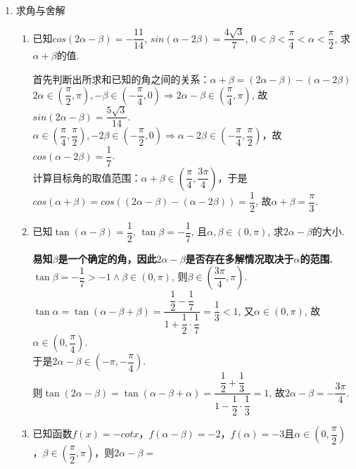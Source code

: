 \begin{enumerate}
\begin{enumerate}
\begin{jieda}
        \end{jieda}
    \end{enumerate}
    \item 求角与舍解
    \begin{enumerate}
        \item 已知$cos(2\alpha-\beta)=-\dfrac{11}{14}$, $sin(\alpha-2\beta)=\dfrac{4\sqrt{3}}{7}$, 
        $0<\beta<\dfrac{\pi}{4}<\alpha<\dfrac{\pi}{2}$, 求$\alpha+\beta$的值. 
        \begin{jieda}
        首先判断出所求和已知的角之间的关系：$\alpha+\beta = (2\alpha-\beta)-(\alpha-2\beta)$ \\
        $2\alpha \in \left(\dfrac{\pi}{2}, \pi \right), -\beta \in \left(-\dfrac{\pi}{4}, 0 \right) \Longrightarrow 2\alpha-\beta \in \left(\dfrac{\pi}{4}, \pi \right)$, 故$sin(2\alpha-\beta)=\dfrac{5\sqrt{3}}{14}$. \\
        $\alpha \in \left(\dfrac{\pi}{4}, \dfrac{\pi}{2} \right), -2\beta \in \left(-\dfrac{\pi}{2}, 0 \right) \Longrightarrow \alpha-2\beta \in \left(-\dfrac{\pi}{4}, \dfrac{\pi}{2} \right)$，故$cos(\alpha-2\beta)=\dfrac{1}{7}$. \\
        计算目标角的取值范围：$\alpha+\beta\in\left(\dfrac{\pi}{4},\dfrac{3\pi}{4}\right)$，于是$cos(\alpha+\beta)=cos((2\alpha-\beta)-(\alpha-2\beta))=\dfrac{1}{2}$, 故$\alpha+\beta=\dfrac{\pi}{3}$. 
        \end{jieda}
        \item 已知$\tan(\alpha-\beta)=\dfrac{1}{2}$, $\tan\beta=-\dfrac{1}{7}$, 且$\alpha,\beta\in(0,\pi)$, 求$2\alpha-\beta$的大小. 
        \begin{jieda}
        \textbf{易知$\beta$是一个确定的角，因此$2\alpha-\beta$是否存在多解情况取决于$\alpha$的范围.} \\
        $\tan\beta=-\dfrac{1}{7}>-1\land\beta\in(0,\pi)$, 则$\beta\in\left(\dfrac{3\pi}{4},\pi\right)$. \\
        $\tan\alpha=\tan(\alpha-\beta+\beta)=\dfrac{\dfrac{1}{2}-\dfrac{1}{7}}{1+\dfrac{1}{2}\cdot\dfrac{1}{7}}=\dfrac{1}{3}<1$, 
        又$\alpha\in(0,\pi)$, 故$\alpha\in\left(0,\dfrac{\pi}{4}\right)$. \\
        于是$2\alpha-\beta\in\left(-\pi,-\dfrac{\pi}{4}\right)$. \\
        则$\tan(2\alpha-\beta)=\tan(\alpha-\beta+\alpha)=\dfrac{\dfrac{1}{2}+\dfrac{1}{3}}{1-\dfrac{1}{2}\cdot\dfrac{1}{3}}=1$, 
        故$2\alpha-\beta=-\dfrac{3\pi}{4}$. 
        \end{jieda}
        \item 已知函数$f(x) = -cotx$，$f(\alpha - \beta) = -2$，$f(\alpha) = -3$且$\alpha \in (0, \dfrac{\pi}{2})$，$\beta \in (\dfrac{\pi}{2}, \pi)$，则$2\alpha - \beta = $

\end{enumerate}
\end{enumerate}
